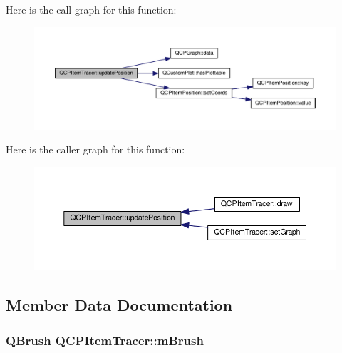 Here is the call graph for this function\+:\nopagebreak
\begin{figure}[H]
\begin{center}
\leavevmode
\includegraphics[width=350pt]{class_q_c_p_item_tracer_a5b90296109e36384aedbc8908a670413_cgraph}
\end{center}
\end{figure}




Here is the caller graph for this function\+:\nopagebreak
\begin{figure}[H]
\begin{center}
\leavevmode
\includegraphics[width=350pt]{class_q_c_p_item_tracer_a5b90296109e36384aedbc8908a670413_icgraph}
\end{center}
\end{figure}




\subsection{Member Data Documentation}
\hypertarget{class_q_c_p_item_tracer_a6597be63a17a266233941354200b2340}{}
\subsubsection[{m\+Brush}]{\setlength{\rightskip}{0pt plus 5cm}Q\+Brush Q\+C\+P\+Item\+Tracer\+::m\+Brush\hspace{0.3cm}{\ttfamily [protected]}}\label{class_q_c_p_item_tracer_a6597be63a17a266233941354200b2340}


